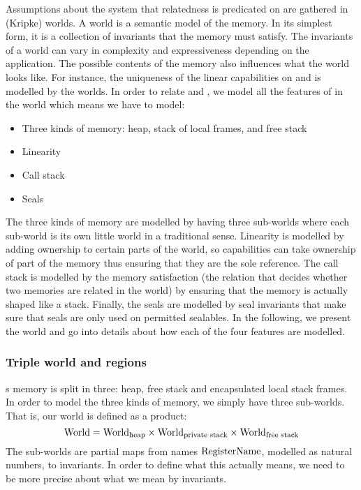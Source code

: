 \begin{jversion}
Assumptions about the system that relatedness is predicated on are gathered in (Kripke) worlds.
A world is a semantic model of the memory.
In its simplest form, it is a collection of invariants that the memory must satisfy.
The invariants of a world can vary in complexity and expressiveness depending on the application.
The possible contents of the memory also influences what the world looks like.
For instance, the uniqueness of the linear capabilities on \trgcm{} and \srccm{} is modelled by the worlds.
In order to relate \trgcm{} and \srccm{}, we model all the features of \srccm{} in the world which means we have to model:
\begin{itemize}
\item Three kinds of memory: heap, stack of local frames, and free stack
\item Linearity
\item Call stack
\item Seals
\end{itemize}
The three kinds of memory are modelled by having three sub-worlds where each sub-world is its own little world in a traditional sense.
Linearity is modelled by adding ownership to certain parts of the world, so capabilities can take ownership of part of the memory thus ensuring that they are the sole reference.
The call stack is modelled by the memory satisfaction (the relation that decides whether two memories are related in the world) by ensuring that the memory is actually shaped like a stack.
Finally, the seals are modelled by seal invariants that make sure that seals are only used on permitted sealables.
In the following, we present the world and go into details about how each of the four features are modelled.

\subsubsection{Triple world and regions}
\srccm{}s memory is split in three: heap, free stack and encapsulated local stack frames.
In order to model the three kinds of memory, we simply have three sub-worlds.
That is, our world is defined as a product:
\[
  \mathrm{World} = \mathrm{World}_\mathrm{heap} \times \mathrm{World}_\text{private stack} \times \mathrm{World}_\text{free stack}
\]
The sub-worlds are partial maps from names $\mathrm{RegisterName}$, modelled as natural numbers, to invariants.
In order to define what this actually means, we need to be more precise about what we mean by invariants.


\end{jversion}
